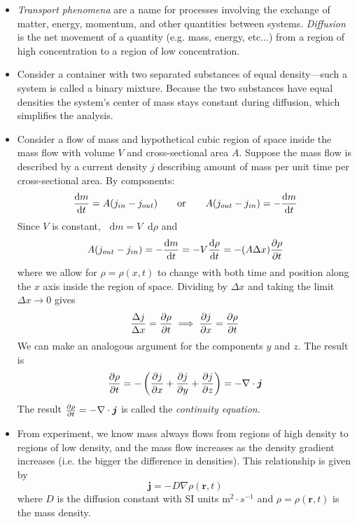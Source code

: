 \documentclass[11pt, a4paper]{article}
\newcommand{\eqtext}[1]{\qquad \text{#1} \qquad}
\newcommand{\diff}{\mathop{}\!\mathrm{d}} %
\begin{document}
\begin{itemize}
	\item \textit{Transport phenomena} are a name for processes involving the exchange of matter, energy, momentum, and other quantities between systems. \textit{Diffusion} is the net movement of a quantity (e.g. mass, energy, etc...) from a region of high concentration to a region of low concentration. 
	
	\item Consider a container with two separated substances of equal density---such a system is called a binary mixture. Because the two substances have equal densities the system's center of mass stays constant during diffusion, which simplifies the analysis.
	
	\item Consider a flow of mass and hypothetical cubic region of space inside the mass flow with volume $ V $ and cross-sectional area $ A $. Suppose the mass flow is described by a current density $ j $ describing amount of mass per unit time per cross-sectional area. By components:
	\begin{equation*}
		\dv{m}{t} = A(j_{in} - j_{out}) \eqtext{or} A(j_{out} - j_{in}) = - \dv{m}{t}
	\end{equation*}
	Since $ V $ is constant, $ \diff m = V \diff \rho $ and
	\begin{equation*}
		 A(j_{out} - j_{in}) = - \dv{m}{t} = - V\dv{\rho}{t} = - (A \Delta x) \pdv{\rho}{t}
	\end{equation*}
	where we allow for $ \rho = \rho (x, t) $ to change with both time and position along the $ x $ axis inside the region of space. Dividing by $ \Delta x $ and taking the limit $ \Delta x \to 0 $ gives
	\begin{equation*}
		\frac{\Delta j}{\Delta x} = \pdv{\rho}{t} \implies \pdv{j}{x} = \pdv{\rho}{t}
	\end{equation*}
	We can make an analogous argument for the components $ y $ and $ z $. The result is
	\begin{equation*}
		\pdv{\rho}{t} = - \left(\pdv{j}{x} + \pdv{j}{y} + \pdv{j}{z}\right) = - \nabla \cdot \bm{j}
	\end{equation*}
	The result $ \pdv{\rho}{t} = - \nabla \cdot \bm{j} $ is called the \textit{continuity equation}.
	
	\item From experiment, we know mass always flows from regions of high density to regions of low density, and the mass flow increases as the density gradient increases (i.e. the bigger the difference in densities). This relationship is given by
	\begin{equation*}
		\bm{j} = - D \nabla \rho(\bm{r}, t)
	\end{equation*}
	where $ D $ is the diffusion constant with SI units $ \si{\meter^{2} \cdot s^{-1}} $ and $ \rho = \rho(\bm{r}, t) $ is the mass density.
	

\end{itemize}
\end{document}
